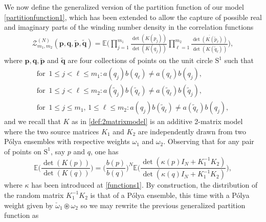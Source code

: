 \documentclass[pdflatex,sn-mathphys-num]{sn-jnl}
\theoremstyle{thmstyleone}
\numberwithin{equation}{section}
\newcommand{\Sp}{\mathrm{S}^{1}}
\begin{document}
We now define the generalized version of the partition function of our model \eqref{partitionfunction1}, which has been extended to allow the capture of possible real and imaginary parts of the winding number density in the correlation functions
\begin{align}\label{partitionfunction2}
    \mathscr{Z}^{\left(N\right)}_{m_{1},m_{2}}\left(\textbf{p},\textbf{q},\widetilde{\textbf{p}},\widetilde{\textbf{q}}\right)=\mathbb{E}\Bigg(\prod\limits_{j=1}^{m_{1}}\frac{\det\left ( K\left ( p_{j} \right ) \right )}{\det\left ( K\left ( q_{j} \right ) \right )}\prod\limits_{\ell=1}^{m_{2}}\frac{\overline{\det\left ( K\left ( \widetilde{p}_{\ell} \right ) \right )}}{\overline{\det\left ( K\left ( \widetilde{q}_{\ell} \right ) \right )}}\Bigg),
\end{align}
where $\mathbf{p},\mathbf{q},\widetilde{\mathbf{p}}$ and $\widetilde{\mathbf{q}}$ are four collections of points on the unit circle $\Sp$ such that 
\begin{align}\label{id:pointsseparation}
    \text{for }\,1\leq j<\ell\leq m_{1}: a(q_j)b(q_{\ell})\neq a(q_{\ell})b(q_j)\nonumber,
    \\
    \text{for }\,1\leq j<\ell\leq m_{2}: a(\widetilde{q}_j)b(\widetilde{q}_{\ell})\neq a(\widetilde{q}_{\ell})b(\widetilde{q}_j),
    \\
    \text{for }\,1\leq j\leq m_{1},\,1\leq \ell\leq m_{2}: a(q_j)b(\widetilde{q}_{\ell})\neq a(\widetilde{q}_{\ell})b(q_j)\nonumber,
\end{align}
and we recall that $K$ as in \eqref{def:2matrixmodel} is an additive 2-matrix model where the two source matrices $K_{1}$ and $K_{2}$ are independently drawn from two P\'olya ensembles with respective weights $\omega_{1}$ and $\omega_{2}$. Observing that for any pair of points on $\Sp$, say $p$ and $q$, one has
\begin{equation}
    \mathbb{E}\Bigg(\frac{\det(K(p))}{\det(K(q))}\Bigg)=\Bigg(\frac{b(p)}{b(q)}\Bigg)^{N}\mathbb{E}\Bigg(\frac{\det(\kappa(p)I_{N}+K_{1}^{-1}K_{2})}{\det(\kappa(q)I_{N}+K_{1}^{-1}K_{2})}\Bigg),
\end{equation}
where $\kappa$ has been introduced at \eqref{functions1}. By construction, the distribution of the random matrix $K_{1}^{-1}K_{2}$ is that of a P\'olya ensemble, this time with a P\'olya weight given by $\check{\omega}_{1}\circledast\omega_{2}$ so we may rewrite the previous generalized partition function as
\end{document}
